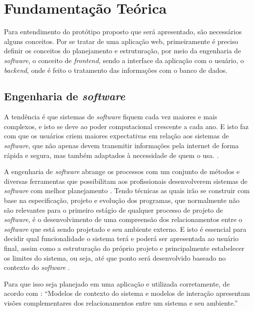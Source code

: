 \chapter{Fundamentação Teórica}\label{chp:LABEL_CHP_2}
Para entendimento do protótipo proposto que será apresentado, são necessários alguns conceitos. Por se tratar de uma aplicação web, primeiramente é preciso definir os conceitos do planejamento e estruturação, por meio da engenharia de \textit{software}, o conceito de \textit{frontend}, sendo a interface da aplicação com o usuário, o \textit{backend}, onde é feito o tratamento das informações com o banco de dados.

\section{Engenharia de \textit{software}}\label{engsoft}
A tendência é que sistemas de \textit{software} fiquem cada vez maiores e mais complexos, e isto se deve ao poder computacional crescente a cada ano. E isto faz com que os usuários criem maiores expectativas em relação aos sistemas de \textit{software}, que não apenas devem transmitir informações pela internet de forma rápida e segura, mas também adaptados à necessidade de quem o usa. \cite{SOMMERVILE}.

A engenharia de \textit{software} abrange os processos com um conjunto de métodos e diversas ferramentas que possibilitam aos profissionais desenvolverem sistemas de \textit{software} com melhor planejamento \cite{PRESSMAN}. Tendo técnicas as quais irão se construir com base na especificação, projeto e evolução dos programas, que normalmente não são relevantes para o primeiro estágio de qualquer processo de projeto de \textit{software}, é o desenvolvimento de uma compreensão dos relacionamentos entre o \textit{software} que está sendo projetado e seu ambiente externo. E isto é essencial para decidir qual funcionalidade o sistema terá e poderá ser apresentada ao usuário final, assim como a estruturação do próprio projeto e principalmente estabelecer os limites do sistema, ou seja, até que ponto será desenvolvido baseado no contexto do \textit{software} \cite{SOMMERVILE}.

Para que isso seja planejado em uma aplicação e utilizada corretamente, de acordo com : “Modelos de contexto do sistema e modelos de interação apresentam visões complementares dos relacionamentos entre um sistema e seu ambiente.”
